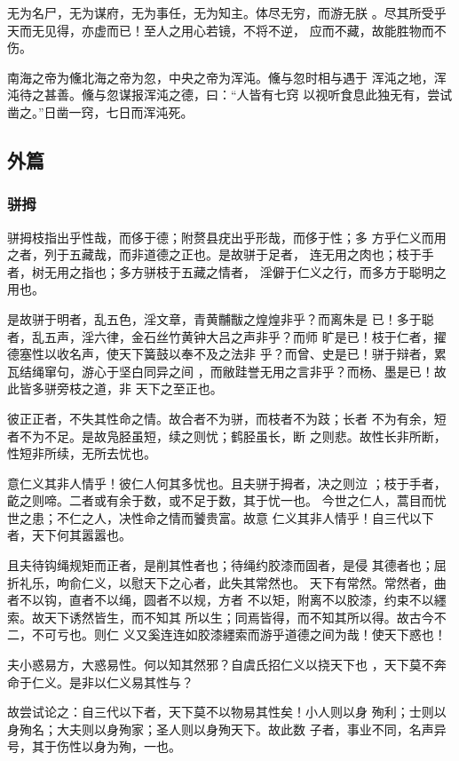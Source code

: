 \documentclass[]{article}
\begin{document}
无为名尸，无为谋府，无为事任，无为知主。体尽无穷，而游无朕
。尽其所受乎天而无见得，亦虚而已！至人之用心若镜，不将不逆，
应而不藏，故能胜物而不伤。

南海之帝为儵北海之帝为忽，中央之帝为浑沌。儵与忽时相与遇于
浑沌之地，浑沌待之甚善。儵与忽谋报浑沌之德，曰：``人皆有七窍
以视听食息此独无有，尝试凿之。''日凿一窍，七日而浑沌死。

\hypertarget{header-n679}{%
\subsection{外篇}\label{header-n679}}

\hypertarget{header-n680}{%
\subsubsection{骈拇}\label{header-n680}}

骈拇枝指出乎性哉，而侈于德；附赘县疣出乎形哉，而侈于性；多
方乎仁义而用之者，列于五藏哉，而非道德之正也。是故骈于足者，
连无用之肉也；枝于手者，树无用之指也；多方骈枝于五藏之情者，
淫僻于仁义之行，而多方于聪明之用也。

是故骈于明者，乱五色，淫文章，青黄黼黻之煌煌非乎？而离朱是
已！多于聪者，乱五声，淫六律，金石丝竹黄钟大吕之声非乎？而师
旷是已！枝于仁者，擢德塞性以收名声，使天下簧鼓以奉不及之法非
乎？而曾、史是已！骈于辩者，累瓦结绳窜句，游心于坚白同异之间
，而敝跬誉无用之言非乎？而杨、墨是已！故此皆多骈旁枝之道，非
天下之至正也。

彼正正者，不失其性命之情。故合者不为骈，而枝者不为跂；长者
不为有余，短者不为不足。是故凫胫虽短，续之则忧；鹤胫虽长，断
之则悲。故性长非所断，性短非所续，无所去忧也。

意仁义其非人情乎！彼仁人何其多忧也。且夫骈于拇者，决之则泣
；枝于手者，齕之则啼。二者或有余于数，或不足于数，其于忧一也。
今世之仁人，蒿目而忧世之患；不仁之人，决性命之情而饕贵富。故意
仁义其非人情乎！自三代以下者，天下何其嚣嚣也。

且夫待钩绳规矩而正者，是削其性者也；待绳约胶漆而固者，是侵
其德者也；屈折礼乐，呴俞仁义，以慰天下之心者，此失其常然也。
天下有常然。常然者，曲者不以钩，直者不以绳，圆者不以规，方者
不以矩，附离不以胶漆，约束不以纆索。故天下诱然皆生，而不知其
所以生；同焉皆得，而不知其所以得。故古今不二，不可亏也。则仁
义又奚连连如胶漆纆索而游乎道德之间为哉！使天下惑也！

夫小惑易方，大惑易性。何以知其然邪？自虞氏招仁义以挠天下也
，天下莫不奔命于仁义。是非以仁义易其性与？

故尝试论之：自三代以下者，天下莫不以物易其性矣！小人则以身
殉利；士则以身殉名；大夫则以身殉家；圣人则以身殉天下。故此数
子者，事业不同，名声异号，其于伤性以身为殉，一也。
\end{document}
